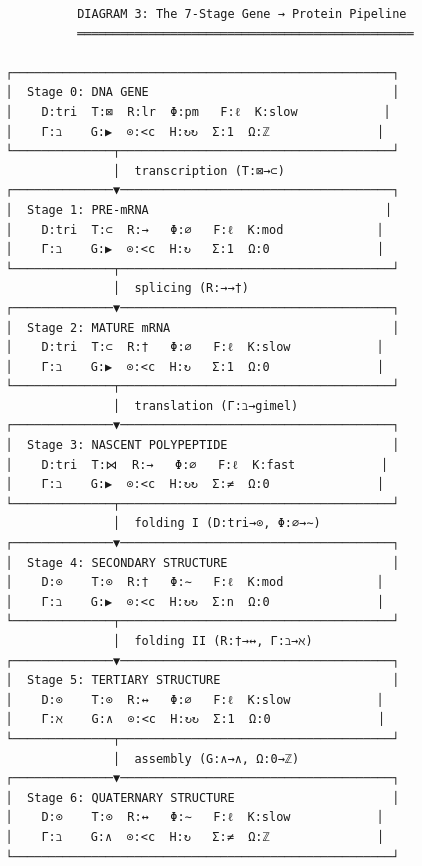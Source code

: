 \begin{verbatim}
                    DIAGRAM 3: The 7-Stage Gene → Protein Pipeline
                    ═══════════════════════════════════════════════

          ┌─────────────────────────────────────────────────────┐
          │  Stage 0: DNA GENE                                  │
          │    D:tri  T:⊠  R:lr  Φ:pm   F:ℓ  K:slow            │
          │    Γ:ℶ    G:▶  ⊙:<c  H:↻↻  Σ:1  Ω:ℤ               │
          └──────────────┬──────────────────────────────────────┘
                         │  transcription (T:⊠→⊂)
          ┌──────────────▼──────────────────────────────────────┐
          │  Stage 1: PRE-mRNA                                 │
          │    D:tri  T:⊂  R:→   Φ:∅   F:ℓ  K:mod             │
          │    Γ:ℶ    G:▶  ⊙:<c  H:↻   Σ:1  Ω:0               │
          └──────────────┬──────────────────────────────────────┘
                         │  splicing (R:→→†)
          ┌──────────────▼──────────────────────────────────────┐
          │  Stage 2: MATURE mRNA                               │
          │    D:tri  T:⊂  R:†   Φ:∅   F:ℓ  K:slow            │
          │    Γ:ℶ    G:▶  ⊙:<c  H:↻   Σ:1  Ω:0               │
          └──────────────┬──────────────────────────────────────┘
                         │  translation (Γ:ℶ→gimel)
          ┌──────────────▼──────────────────────────────────────┐
          │  Stage 3: NASCENT POLYPEPTIDE                       │
          │    D:tri  T:⋈  R:→   Φ:∅   F:ℓ  K:fast            │
          │    Γ:ℶ    G:▶  ⊙:<c  H:↻↻  Σ:≠  Ω:0               │
          └──────────────┬──────────────────────────────────────┘
                         │  folding I (D:tri→⊙, Φ:∅→∼)
          ┌──────────────▼──────────────────────────────────────┐
          │  Stage 4: SECONDARY STRUCTURE                       │
          │    D:⊙    T:⊙  R:†   Φ:∼   F:ℓ  K:mod             │
          │    Γ:ℶ    G:▶  ⊙:<c  H:↻↻  Σ:n  Ω:0               │
          └──────────────┬──────────────────────────────────────┘
                         │  folding II (R:†→↔, Γ:ℶ→ℵ)
          ┌──────────────▼──────────────────────────────────────┐
          │  Stage 5: TERTIARY STRUCTURE                        │
          │    D:⊙    T:⊙  R:↔   Φ:∅   F:ℓ  K:slow            │
          │    Γ:ℵ    G:∧  ⊙:<c  H:↻↻  Σ:1  Ω:0               │
          └──────────────┬──────────────────────────────────────┘
                         │  assembly (G:∧→∧, Ω:0→ℤ)
          ┌──────────────▼──────────────────────────────────────┐
          │  Stage 6: QUATERNARY STRUCTURE                      │
          │    D:⊙    T:⊙  R:↔   Φ:∼   F:ℓ  K:slow            │
          │    Γ:ℶ    G:∧  ⊙:<c  H:↻   Σ:≠  Ω:ℤ               │
          └─────────────────────────────────────────────────────┘
\end{verbatim}

